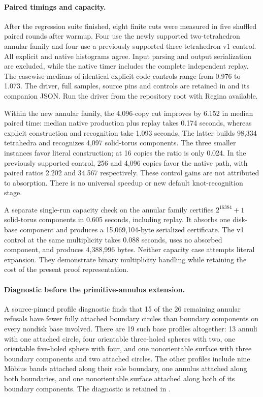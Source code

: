 \paragraph{Paired timings and capacity.}
After the regression suite finished, eight finite cuts were measured in
five shuffled paired rounds after warmup. Four use the newly supported
two-tetrahedron annular family and four use a previously supported
three-tetrahedron v1 control. All explicit and native histograms agree.
Input parsing and output serialization are excluded, while the native timer
includes the complete independent replay. The casewise medians of identical
explicit-code controls range from 0.976 to 1.073. The driver, full samples,
source pins and controls are retained in
 and its companion JSON. Run the driver
from the repository root with Regina available.



Within the new annular family, the 4,096-copy cut improves by 6.152 in
median paired time: median native production plus replay takes 0.174 seconds,
whereas explicit construction and recognition take 1.093 seconds. The latter
builds 98,334 tetrahedra and recognizes 4,097 solid-torus components. The three
smaller instances favor literal construction; at 16 copies the ratio is
only 0.024. In the previously supported control, 256 and 4,096 copies favor
the native path, with paired ratios 2.202 and 34.567 respectively. These
control gains are not attributed to absorption. There is no universal
speedup or new default knot-recognition stage.

A separate single-run capacity check on the annular family certifies
$2^{16384}+1$ solid-torus components in 0.605 seconds, including replay.
It absorbs one disk-base component and produces a 15,069,104-byte serialized
certificate. The v1 control at the same multiplicity takes 0.088 seconds,
uses no absorbed component, and produces 4,388,996 bytes. Neither capacity
case attempts literal expansion. They demonstrate binary multiplicity
handling while retaining the cost of the present proof representation.

\paragraph{Diagnostic before the primitive-annulus extension.}
A source-pinned profile diagnostic finds that 15 of the 26 remaining annular
refusals have fewer fully attached boundary circles than boundary components
on every nondisk base involved. There are 19 such base profiles altogether:
13 annuli with one attached circle, four orientable three-holed spheres with
two, one orientable five-holed sphere with four, and one nonorientable surface
with three boundary components and two attached circles. The other profiles
include nine M\"obius bands attached along their sole boundary, one annulus
attached along both boundaries, and one nonorientable surface attached along
both of its boundary components. The diagnostic is retained in
.

